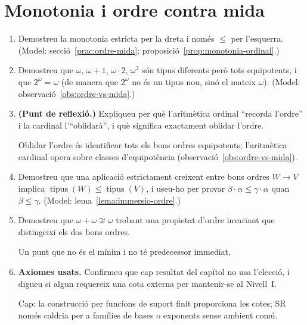 \section{Monotonia i ordre contra mida}

\begin{enumerate}[resume]
  \item Demostreu la monotonia estricta per la dreta i només \(\le\) per l'esquerra. (Model: secció~\ref{prac:ordre-mida}; proposició~\ref{prop:monotonia-ordinal}.)

  \item Demostreu que \(\omega\), \(\omega+1\), \(\omega\cdot2\), \(\omega^2\) són tipus diferents però tots equipotents, i que \(2^\omega=\omega\) (de manera que \(2^\omega\) no és un tipus nou, sinó el mateix \(\omega\)). (Model: observació~\ref{obs:ordre-vs-mida}.)

  \item \textbf{(Punt de reflexió.)} Expliqueu per què l'aritmètica ordinal \enquote{recorda l'ordre} i la cardinal l'\enquote{oblidarà}, i què significa exactament oblidar l'ordre. \begin{indicacio}Oblidar l'ordre és identificar tots els bons ordres equipotents; l'aritmètica cardinal opera sobre classes d'equipotència (observació~\ref{obs:ordre-vs-mida}).\end{indicacio}

  \item Demostreu que una aplicació estrictament creixent entre bons ordres \(W\to V\) implica \(\operatorname{tipus}(W)\le\operatorname{tipus}(V)\), i useu-ho per provar \(\beta\cdot\alpha\le\gamma\cdot\alpha\) quan \(\beta\le\gamma\). (Model: lema~\ref{lema:immersio-ordre}.)

  \item Demostreu que \(\omega+\omega\not\cong\omega\) trobant una propietat d'ordre invariant que distingeixi els dos bons ordres. \begin{indicacio}Un punt que no és el mínim i no té predecessor immediat.\end{indicacio}

  \item \textbf{Axiomes usats.} Confirmeu que cap resultat del capítol no usa l'elecció, i digueu si algun requereix una cota externa per mantenir-se al Nivell~I. \begin{indicacio}Cap: la construcció per funcions de suport finit proporciona les cotes; SR només caldria per a famílies de bases o exponents sense ambient comú.\end{indicacio}
\end{enumerate}
